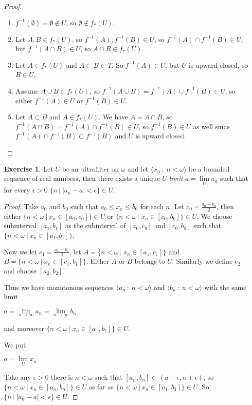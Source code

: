 \documentclass[8pt]{article}
\theoremstyle{definition}
\theoremstyle{definition}
\theoremstyle{definition}
\theoremstyle{definition}
\theoremstyle{definition}
\theoremstyle{definition}
\theoremstyle{definition}
\theoremstyle{definition}
\theoremstyle{definition}
\theoremstyle{definition}
\theoremstyle{definition}
\theoremstyle{definition}
\theoremstyle{definition}
\newtheorem{exercise}{Exercise}[section]
\theoremstyle{definition}
\theoremstyle{question}
\begin{document}
\begin{proof}
  \begin{enumerate}
    \item $f^{-1}(\emptyset) = \emptyset \notin U$, so $\emptyset \notin f_*(U)$.
    \item Let $A, B \in f_*(U)$, so $f^{-1}(A), f^{-1}(B) \in U$, so
    $f^{-1}(A) \cap f^{-1}(B) \in U$, but $f^{-1}(A \cap B) \in U$, so $A \cap B \in f_{*}(U)$.
    \item Let $A \in f_*(U)$ and $A \subset B \subset T$.
    So $f^{-1}(A) \in U$, but $U$ is upward closed, so $B \in U$.
    \item Assume $A \cup B \in f_*(U)$, so $f^{-1}(A \cup B) = f^{-1}(A) \cup f^{-1}(B) \in U$, so
    either $f^{-1}(A) \in U$ or $f^{-1}(B) \in U$.
    \item Let $A \subset B$ and $A \in f_*(U)$.
    We have $A = A \cap B$, so $f^{-1}(A \cap B) = f^{-1}(A) \cap f^{-1}(B) \in U$, so $f^{-1}(B) \in U$ as well since
    $f^{-1}(A) \cap f^{-1}(B) \subset f^{-1}(B)$ and $U$ is upward closed.
  \end{enumerate}
\end{proof}

\begin{exercise}
  Let $U$ be an ultrafilter on $\omega$ and let $\langle x_n \: : \: n < \omega \rangle$ be a bounded sequence of real numbers,
  then there exists a unique \emph{$U$-limit} $a = \lim \limits_U a_n$
  such that for every $\epsilon > 0$ $\{ n \: | \: |a_n - a| < \epsilon \} \in U$.
\end{exercise}

\begin{proof}
  Take $a_0$ and $b_0$ such that $a_0 \leq x_n \leq b_0$ for each $n$.
  Let $c_0 = \frac{a_0 + b_0}{2}$, then either
  $\{ n < \omega \: | \: x_n \in [a_0, c_0] \} \in U$ or  $\{ n < \omega \: | \: x_n \in [c_0, b_0] \} \in U$.
  We choose subinterval $[a_1, b_1]$ as the subinterval of $[a_0, c_0]$ and $[c_0, b_0]$
  such that $\{ n < \omega \: | \: x_n \in [a_1, b_1]\}$.

  Now we let $c_1 = \frac{a_1 + b_1}{2}$, let $A = \{ n < \omega \: |\: x_n \in [a_1, c_1] \}$ and $B = 
  \{ n < \omega \: | \: x_n \in [c_1, b_1]\}$. Either $A$ or $B$ belongs to $U$.
  Similarly we define $c_2$ and choose $[a_2, b_2]$.

  Thus we have monotonous sequences $\langle a_n \: : \: n < \omega \rangle$ and 
  $\langle b_n \: : \: n < \omega \rangle$ with the same limit
  \begin{center}
    $a = \lim \limits_{n \to \infty} a_n = \lim \limits_{n \to \infty} b_n$
  \end{center}
  and moreover $\{ n < \omega \: | \: x_n \in [a_1, b_1]\} \in U$.

  We put
  \begin{center}
    $a = \lim \limits_U x_n$
  \end{center}
  Take any $\epsilon > 0$ there is $n < \omega$ such that $[a_n, b_n] \subset (a - \epsilon, a + \epsilon)$, so
  $\{ n < \omega \: | \: x_n \in [a_n, b_n] \} \in U$ as far as $\{ n < \omega \: | \: x_n \in [a_1, b_1]\} \in U$.
  So  $\{ n \: | \: |a_n - a| < \epsilon \} \in U$.
\end{proof}
\end{document}

